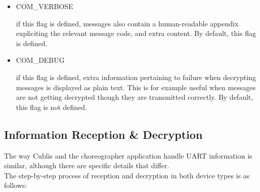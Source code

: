 \begin{itemize}
\item[] COM\_VERBOSE

	if this flag is defined, messages also contain a human-readable appendix expliciting the relevant message code, and extra content. By default, this flag is defined.

\item[] COM\_DEBUG

	if this flag is defined, extra information pertaining to failure when decrypting messages is displayed as plain text. This is for example useful when messages are not getting decrypted though they are transmitted correctly. By default, this flag is not defined.
    
\end{itemize}

\subsection{Information Reception \& Decryption}

The way Cublis and the choreographer application handle UART information is similar, although there are specific details that differ.\\

The step-by-step process of reception and decryption in both device types is as follows:\\

